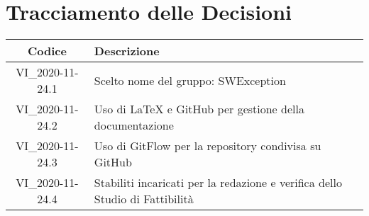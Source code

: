 \section*{Tracciamento delle Decisioni}

\begin{center}
	\begin{longtable}{|c|p{14.5cm}|}
	\hline
	\rowcolor{lighter-grayer}
	\textbf{Codice} & \textbf{Descrizione} \\
	\hline
	\endfirsthead

	\hline
	VI\_2020-11-24.1 & Scelto nome del gruppo: SWException \\
	VI\_2020-11-24.2 & Uso di LaTeX e GitHub per gestione della documentazione \\
	VI\_2020-11-24.3 & Uso di GitFlow per la repository condivisa su GitHub\\
	VI\_2020-11-24.4 & Stabiliti incaricati per la redazione e verifica dello Studio di Fattibilità\\
	\hline

	\end{longtable}
\end{center}